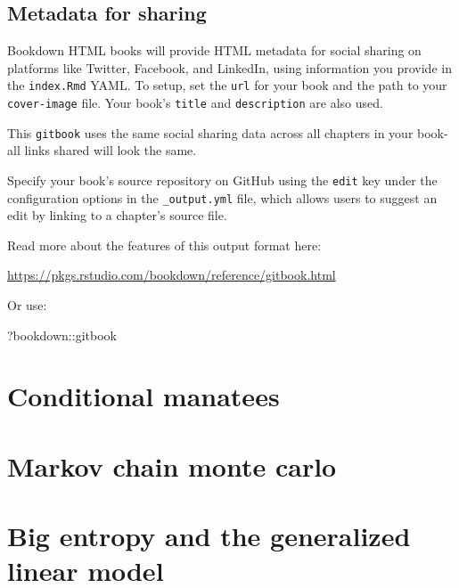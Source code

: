 \documentclass[
]{book}
\newenvironment{Shaded}{\begin{snugshade}}{\end{snugshade}}
\newcommand{\NormalTok}[1]{#1}
\newcommand{\SpecialCharTok}[1]{\textcolor[rgb]{0.00,0.00,0.00}{#1}}
\theoremstyle{definition}
\theoremstyle{definition}
\theoremstyle{definition}
\theoremstyle{definition}
\theoremstyle{remark}
\begin{document}
\hypertarget{metadata-for-sharing}{%
\section{Metadata for sharing}\label{metadata-for-sharing}}

Bookdown HTML books will provide HTML metadata for social sharing on platforms like Twitter, Facebook, and LinkedIn, using information you provide in the \texttt{index.Rmd} YAML. To setup, set the \texttt{url} for your book and the path to your \texttt{cover-image} file. Your book's \texttt{title} and \texttt{description} are also used.

This \texttt{gitbook} uses the same social sharing data across all chapters in your book- all links shared will look the same.

Specify your book's source repository on GitHub using the \texttt{edit} key under the configuration options in the \texttt{\_output.yml} file, which allows users to suggest an edit by linking to a chapter's source file.

Read more about the features of this output format here:

\url{https://pkgs.rstudio.com/bookdown/reference/gitbook.html}

Or use:

\begin{Shaded}
\begin{Highlighting}[]
\NormalTok{?bookdown}\SpecialCharTok{::}\NormalTok{gitbook}
\end{Highlighting}
\end{Shaded}

\hypertarget{conditional-manatees}{%
\chapter{Conditional manatees}\label{conditional-manatees}}

\hypertarget{markov-chain-monte-carlo}{%
\chapter{Markov chain monte carlo}\label{markov-chain-monte-carlo}}

\hypertarget{big-entropy-and-the-generalized-linear-model}{%
\chapter{Big entropy and the generalized linear model}\label{big-entropy-and-the-generalized-linear-model}}
\end{document}
